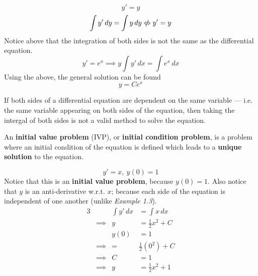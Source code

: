 \documentclass[twoside]{report}
\begin{document}
    \begin{example}
        \begin{equation}
            y' = y
        \end{equation}
        \begin{equation}
            \int y'\,dy = \int y\,dy \notLeftrightarrow y' = y
        \end{equation}
        Notice above that the integration of both sides is not the same as the differential equation.
        \begin{equation}
            y' = e^x \implies y \int y'\,dx = \int e^x\,dx
        \end{equation}
        Using the above, the general solution can be found
        \begin{equation}
            y = Ce^{x}
        \end{equation}
    \end{example}
    \begin{remark}
        If both sides of a differential equation are dependent on the same variable --- i.e. the same variable appearing on both sides of the equation, then taking the intergal of both sides is not a valid method to solve the equation.
    \end{remark}
    \begin{definition}
        An \textbf{initial value problem} (IVP), or \textbf{initial condition problem}, is a problem where an initial condition of the equation is defined which leads to a \textbf{unique solution} to the equation.
    \end{definition}
    \np
    \begin{example}
        \begin{equation}
            y' = x,\ y(0) = 1
        \end{equation}
        Notice that this is an \textbf{initial value problem}, because $y(0) = 1$. Also notice that $y$ is an anti-derivative w.r.t. $x$; because each side of the equation is independent of one another (unlike \emph{Example 1.3}).
        \begin{alignat}{3}
            &&\int y'\,dx &= \int x\,dx\\
            &\implies & y &= \frac{1}{2}x^{2} + C\\
            &&y(0) &= 1\\
            &\implies&=&\frac{1}{2}(0^2) + C\\
            &\implies&C&=1\\
            &\implies&y&=\frac{1}{2}x^{2} + 1
        \end{alignat}
    \end{example}
\end{document}
